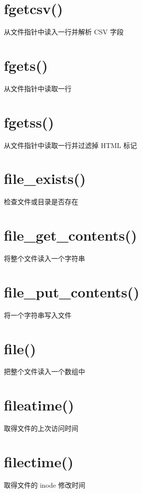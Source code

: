 \section{fgetcsv()}

从文件指针中读入一行并解析 CSV 字段

\section{fgets()}

从文件指针中读取一行

\section{fgetss()}

从文件指针中读取一行并过滤掉 HTML 标记

\section{file\_exists()}

检查文件或目录是否存在

\section{file\_get\_contents()}

将整个文件读入一个字符串

\section{file\_put\_contents()}

将一个字符串写入文件

\section{file()}

把整个文件读入一个数组中

\section{fileatime()}

取得文件的上次访问时间

\section{filectime()}

取得文件的 inode 修改时间

